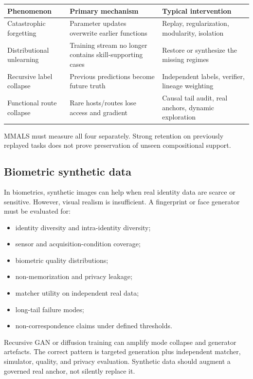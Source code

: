 \begin{longtable}{p{}p{}p{}}
\toprule
\textbf{Phenomenon} & \textbf{Primary mechanism} & \textbf{Typical intervention} \\
\midrule
Catastrophic forgetting & Parameter updates overwrite earlier functions & Replay, regularization, modularity, isolation \\
Distributional unlearning & Training stream no longer contains skill-supporting cases & Restore or synthesize the missing regimes \\
Recursive label collapse & Previous predictions become future truth & Independent labels, verifier, lineage weighting \\
Functional route collapse & Rare hosts/routes lose access and gradient & Causal tail audit, real anchors, dynamic exploration \\
\bottomrule
\end{longtable}

MMALS must measure all four separately. Strong retention on previously replayed tasks does not prove preservation of unseen compositional support.

\subsection{Biometric synthetic data}

In biometrics, synthetic images can help when real identity data are scarce or sensitive. However, visual realism is insufficient. A fingerprint or face generator must be evaluated for:

\begin{itemize}[leftmargin=*]
  \item identity diversity and intra-identity diversity;
  \item sensor and acquisition-condition coverage;
  \item biometric quality distributions;
  \item non-memorization and privacy leakage;
  \item matcher utility on independent real data;
  \item long-tail failure modes;
  \item non-correspondence claims under defined thresholds.
\end{itemize}

Recursive GAN or diffusion training can amplify mode collapse and generator artefacts. The correct pattern is targeted generation plus independent matcher, simulator, quality, and privacy evaluation. Synthetic data should augment a governed real anchor, not silently replace it.

